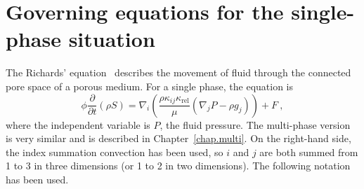 \documentclass[]{scrreprt}
\begin{document}
\chapter{Governing equations for the single-phase situation}
\label{chap.govern.eqn}
The Richards' equation~\cite{richards1931} describes the movement of
fluid through the connected pore space of a porous medium.  For a
single phase, the equation is
\begin{equation}
\phi \frac{\partial}{\partial t} \left( \rho S \right) = \nabla_{i}
\left( \frac{\rho \kappa_{ij}\kappa_{\mathrm{rel}}}{\mu} (\nabla_{j}P - \rho g_{j}) \right)
+ F \ ,
\label{richards.eqn}
\end{equation}
where the independent variable is $P$, the fluid pressure.  The
multi-phase version is very similar and is described in
Chapter~\ref{chap.multi}.  On the
right-hand side, the index summation convection has been used, so $i$
and $j$ are both summed from 1 to 3 in three dimensions (or 1 to 2 in
two dimensions).  The following notation has been used.
\end{document}
